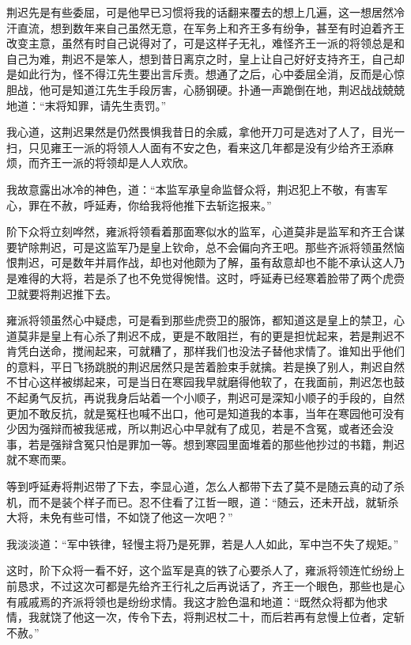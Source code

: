 荆迟先是有些委屈，可是他早已习惯将我的话翻来覆去的想上几遍，这一想居然冷汗直流，想到数年来自己虽然无意，在军务上和齐王多有纷争，甚至有时迫着齐王改变主意，虽然有时自己说得对了，可是这样子无礼，难怪齐王一派的将领总是和自己为难，荆迟不是笨人，想到昔日离京之时，皇上让自己好好支持齐王，自己却是如此行为，怪不得江先生要出言斥责。想通了之后，心中委屈全消，反而是心惊胆战，他可是知道江先生手段厉害，心肠钢硬。扑通一声跪倒在地，荆迟战战兢兢地道：“末将知罪，请先生责罚。”

我心道，这荆迟果然是仍然畏惧我昔日的余威，拿他开刀可是选对了人了，目光一扫，只见雍王一派的将领人人面有不安之色，看来这几年都是没有少给齐王添麻烦，而齐王一派的将领却是人人欢欣。

我故意露出冰冷的神色，道：“本监军承皇命监督众将，荆迟犯上不敬，有害军心，罪在不赦，呼延寿，你给我将他推下去斩迄报来。”

阶下众将立刻哗然，雍派将领看着那面寒似水的监军，心道莫非是监军和齐王合谋要铲除荆迟，可是这监军乃是皇上钦命，总不会偏向齐王吧。那些齐派将领虽然恼恨荆迟，可是数年并肩作战，却也对他颇为了解，虽有敌意却也不能不承认这人乃是难得的大将，若是杀了也不免觉得惋惜。这时，呼延寿已经寒着脸带了两个虎赍卫就要将荆迟推下去。

雍派将领虽然心中疑虑，可是看到那些虎赍卫的服饰，都知道这是皇上的禁卫，心道莫非是皇上有心杀了荆迟不成，更是不敢阻拦，有的更是担忧起来，若是荆迟不肯凭白送命，搅闹起来，可就糟了，那样我们也没法子替他求情了。谁知出乎他们的意料，平日飞扬跳脱的荆迟居然只是苦着脸束手就擒。若是换了别人，荆迟自然不甘心这样被绑起来，可是当日在寒园我早就磨得他软了，在我面前，荆迟怎也鼓不起勇气反抗，再说我身后站着一个小顺子，荆迟可是深知小顺子的手段的，自然更加不敢反抗，就是冤枉也喊不出口，他可是知道我的本事，当年在寒园他可没有少因为强辩而被我惩戒，所以荆迟心中早就有了成见，若是不含冤，或者还会没事，若是强辩含冤只怕是罪加一等。想到寒园里面堆着的那些他抄过的书籍，荆迟就不寒而栗。

等到呼延寿将荆迟带了下去，李显心道，怎么人都带下去了莫不是随云真的动了杀机，而不是装个样子而已。忍不住看了江哲一眼，道：“随云，还未开战，就斩杀大将，未免有些可惜，不如饶了他这一次吧？”

我淡淡道：“军中铁律，轻慢主将乃是死罪，若是人人如此，军中岂不失了规矩。”

这时，阶下众将一看不好，这个监军是真的铁了心要杀人了，雍派将领连忙纷纷上前恳求，不过这次可都是先给齐王行礼之后再说话了，齐王一个眼色，那些也是心有戚戚焉的齐派将领也是纷纷求情。我这才脸色温和地道：“既然众将都为他求情，我就饶了他这一次，传令下去，将荆迟杖二十，而后若再有怠慢上位者，定斩不赦。”

